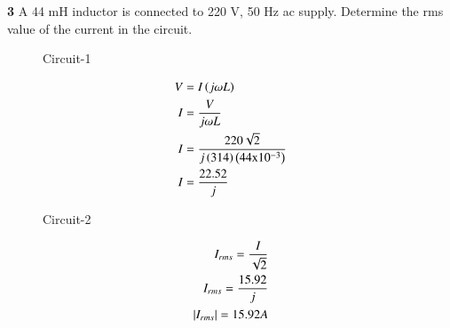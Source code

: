 \documentclass[journal,12pt,twocolumn]{IEEEtran}
\begin{document}


\vspace{3cm}

\title{}
\author{EE23BTECH11047 - Deepakreddy P
}
\maketitle
\newpage
\bigskip


\noindent \textbf{3} \quad A 44 mH inductor is connected to 220 V, 50 Hz ac supply. Determine
the rms value of the current in the circuit.\\
\solution


\begin{figure}[ht]
  \centering
  \begin{adjustbox}{width=\columnwidth}
      
  \end{adjustbox}
  \caption{Circuit-1}
\end{figure}

\begin{align}
    V &= I \left(j \omega L\right) \\
    I &= \frac{V}{j \omega L} \\
    I &= \frac{220 \sqrt{2}}{j \left(314\right) \left(44 \text{x} 10^{-3}\right)}\\
    I &= \frac{22.52}{j}
\end{align}


\begin{figure}[ht]
  \centering
  \begin{adjustbox}{width=\columnwidth}
      
  \end{adjustbox}
  \caption{Circuit-2}
\end{figure}

\begin{align}
    I_{rms} = \frac{I}{\sqrt{2}}\\
    I_{rms} = \frac{15.92}{j}\\
    \left\vert I_{rms}\right\vert = 15.92 A
\end{align}

\begin{center}
    \begin{table}[ht]
        
    \end{table}
\end{center}

\begin{center}
    \begin{table}[ht]
        
    \end{table}
\end{center}
\end{document}
